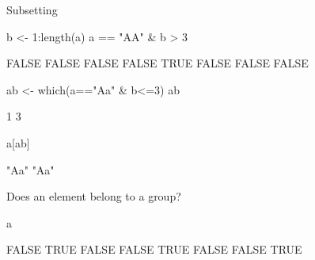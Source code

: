 \documentclass[11pt,german,hideothersubsections]{beamer}
\begin{document}
\begin{frame}[fragile]{Subsetting}
\footnotesize{
\begin{Schunk}
\begin{Sinput}
 b <- 1:length(a)
 a == "AA" & b > 3
\end{Sinput}
\begin{Soutput}
[1] FALSE FALSE FALSE FALSE  TRUE FALSE FALSE FALSE
\end{Soutput}
\begin{Sinput}
 ab <- which(a=="Aa" & b<=3)
 ab
\end{Sinput}
\begin{Soutput}
[1] 1 3
\end{Soutput}
\begin{Sinput}
 a[ab]
\end{Sinput}
\begin{Soutput}
[1] "Aa" "Aa"
\end{Soutput}
\end{Schunk}
\vspace{.25cm}
Does an element belong to a group?
\begin{Schunk}
\begin{Sinput}
 a %
\end{Sinput}
\begin{Soutput}
[1] FALSE  TRUE FALSE FALSE  TRUE FALSE FALSE  TRUE
\end{Soutput}
\end{Schunk}
}
\end{frame}
\end{document}
